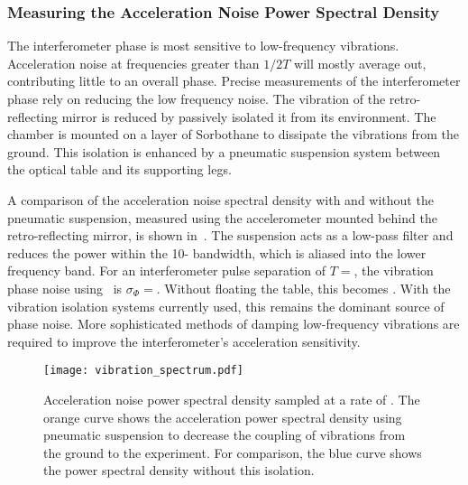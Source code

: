 \subsubsection{Measuring the Acceleration Noise Power Spectral Density}
The interferometer phase is most sensitive to low-frequency
vibrations. Acceleration noise at frequencies greater than \(1/2T\)
will mostly average out, contributing little to an overall phase.
Precise measurements of the interferometer phase rely on reducing the
low frequency noise. The vibration of the retro-reflecting mirror is
reduced by passively isolated it from its environment. The
chamber is mounted on a layer of Sorbothane to dissipate the
vibrations from the ground. This isolation is enhanced by a
pneumatic suspension system between the optical table and its
supporting legs. 
\par\noindent
A comparison of the acceleration noise spectral density with and
without the pneumatic suspension, measured using
the accelerometer mounted behind the retro-reflecting mirror, is shown
in~. The suspension acts as a
low-pass filter and reduces the power within the
10- bandwidth, which is aliased into the lower
frequency band. For an interferometer pulse separation of \(T =
\), the
vibration phase noise using~ is \(\sigma_\Phi = \). Without
floating the table, this becomes . With the
vibration isolation systems currently used, this remains the dominant
source of phase noise. More sophisticated methods of damping
low-frequency vibrations are required to improve the interferometer's
acceleration sensitivity. 
\begin{figure}[htpb!]
  \centering
  \texttt{[image: vibration\_spectrum.pdf]}
  \caption[Acceleration noise power spectral density.]{Acceleration
  noise power spectral density sampled at a rate of
. The orange curve shows the acceleration
power spectral density using pneumatic suspension to decrease the
coupling of vibrations from the ground to the experiment. For
comparison, the blue curve shows the power spectral density without
this isolation.}
  \label{fig:vibration_spectrum}
\end{figure}
